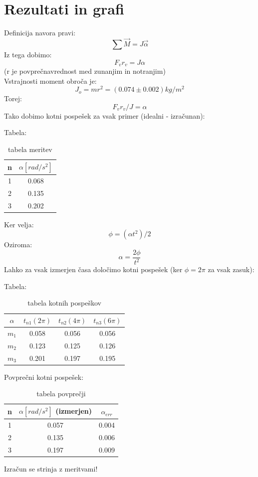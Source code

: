 \documentclass[11pt]{article}
\begin{document}
    \section{Rezultati in grafi}
    Definicija navora pravi:
    \[
        \sum \vec{M} = J \vec{\alpha}
    \]
    Iz tega dobimo:
    \[
        F_v r_{v} = J \alpha
    \]
    (r je povprečnavrednost med zunanjim in notranjim)
    \\
    Vstrajnosti moment obroča je:
    \[
        J_o = m r^2 = (0.074 \pm 0.002) kg/m^2
    \]
    Torej:
    \[
        F_v r_{v} / J =  \alpha
    \]
    Tako dobimo kotni pospešek za vsak primer (idealni - izračunan):

    Tabela:
    \begin{table}[h!]
        \centering
        \begin{tabular}{|c|c|}
            \hline
            n & $\alpha [rad/s^2]$\\
            \hline
            1 & 0.068 \\
            2 & 0.135 \\
            3 & 0.202 \\
            \hline
        \end{tabular}
        \caption{tabela meritev}
        \label{tab:2}
    \end{table}

    Ker velja:
    \[
        \phi = (\alpha t^2)/2
    \]
    Oziroma:
    \[
        \alpha = \frac{2 \phi}{t^2}
    \]
    Lahko za vsak izmerjen časa določimo kotni pospešek (ker $\phi = 2\pi$ za vsak zasuk):

    Tabela:
    \begin{table}[h!]
        \centering
        \begin{tabular}{|c|c|c|c|}
            \hline
            $\alpha$ &  $t_{n1} (2\pi)$ & $t_{n2} (4\pi)$& $t_{n3} (6\pi)$\\
            \hline
            $m_1$ & 0.058 & 0.056 & 0.056 \\
            $m_2$ & 0.123 & 0.125 & 0.126 \\
            $m_3$ & 0.201 & 0.197 & 0.195 \\
            \hline
        \end{tabular}
        \caption{tabela kotnih pospeškov}
        \label{tab:5}
    \end{table}

    Povprečni kotni pospešek:
    \begin{table}[h!]
        \centering
        \begin{tabular}{|c|c|c|}
            \hline
            n & $\alpha [rad/s^2]$ (izmerjen) & $\alpha_{err}$\\
            \hline
            1 & 0.057 & 0.004\\
            2 & 0.135 & 0.006\\
            3 & 0.197 & 0.009\\
            \hline
        \end{tabular}
        \caption{tabela povprečji}
        \label{tab:6}
    \end{table}
    Izračun se strinja z meritvami!
    \\
\end{document}
